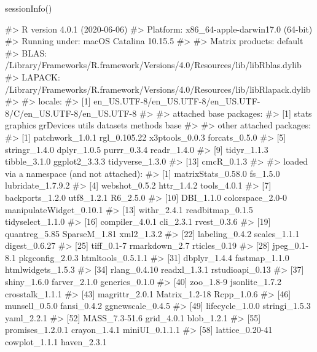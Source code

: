 \begin{Schunk}
\begin{Sinput}
sessionInfo()
\end{Sinput}
\begin{Soutput}
#> R version 4.0.1 (2020-06-06)
#> Platform: x86_64-apple-darwin17.0 (64-bit)
#> Running under: macOS Catalina 10.15.5
#> 
#> Matrix products: default
#> BLAS:   /Library/Frameworks/R.framework/Versions/4.0/Resources/lib/libRblas.dylib
#> LAPACK: /Library/Frameworks/R.framework/Versions/4.0/Resources/lib/libRlapack.dylib
#> 
#> locale:
#> [1] en_US.UTF-8/en_US.UTF-8/en_US.UTF-8/C/en_US.UTF-8/en_US.UTF-8
#> 
#> attached base packages:
#> [1] stats     graphics  grDevices utils     datasets  methods   base     
#> 
#> other attached packages:
#>  [1] patchwork_1.0.1 rgl_0.105.22    x3ptools_0.0.3  forcats_0.5.0  
#>  [5] stringr_1.4.0   dplyr_1.0.5     purrr_0.3.4     readr_1.4.0    
#>  [9] tidyr_1.1.3     tibble_3.1.0    ggplot2_3.3.3   tidyverse_1.3.0
#> [13] cmcR_0.1.3     
#> 
#> loaded via a namespace (and not attached):
#>  [1] matrixStats_0.58.0      fs_1.5.0                lubridate_1.7.9.2      
#>  [4] webshot_0.5.2           httr_1.4.2              tools_4.0.1            
#>  [7] backports_1.2.0         utf8_1.2.1              R6_2.5.0               
#> [10] DBI_1.1.0               colorspace_2.0-0        manipulateWidget_0.10.1
#> [13] withr_2.4.1             readbitmap_0.1.5        tidyselect_1.1.0       
#> [16] compiler_4.0.1          cli_2.3.1               rvest_0.3.6            
#> [19] quantreg_5.85           SparseM_1.81            xml2_1.3.2             
#> [22] labeling_0.4.2          scales_1.1.1            digest_0.6.27          
#> [25] tiff_0.1-7              rmarkdown_2.7           rticles_0.19           
#> [28] jpeg_0.1-8.1            pkgconfig_2.0.3         htmltools_0.5.1.1      
#> [31] dbplyr_1.4.4            fastmap_1.1.0           htmlwidgets_1.5.3      
#> [34] rlang_0.4.10            readxl_1.3.1            rstudioapi_0.13        
#> [37] shiny_1.6.0             farver_2.1.0            generics_0.1.0         
#> [40] zoo_1.8-9               jsonlite_1.7.2          crosstalk_1.1.1        
#> [43] magrittr_2.0.1          Matrix_1.2-18           Rcpp_1.0.6             
#> [46] munsell_0.5.0           fansi_0.4.2             ggnewscale_0.4.5       
#> [49] lifecycle_1.0.0         stringi_1.5.3           yaml_2.2.1             
#> [52] MASS_7.3-51.6           grid_4.0.1              blob_1.2.1             
#> [55] promises_1.2.0.1        crayon_1.4.1            miniUI_0.1.1.1         
#> [58] lattice_0.20-41         cowplot_1.1.1           haven_2.3.1            

\end{Soutput}
\end{Schunk}
